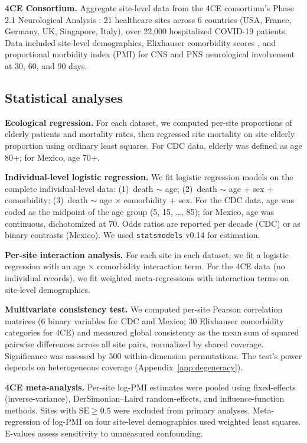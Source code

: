 \documentclass[11pt]{article}
\begin{document}
\textbf{4CE Consortium.}  Aggregate site-level data from the 4CE consortium's
Phase 2.1 Neurological Analysis \cite{four_ce_neuro2021}: 21 healthcare sites
across 6 countries (USA, France, Germany, UK, Singapore, Italy), over 22,000
hospitalized COVID-19 patients.  Data included site-level demographics,
Elixhauser comorbidity scores \cite{elixhauser1998}, and proportional morbidity
index (PMI) for CNS and PNS neurological involvement at 30, 60, and 90 days.

\subsection{Statistical analyses}

\textbf{Ecological regression.}  For each dataset, we computed per-site
proportions of elderly patients and mortality rates, then regressed site
mortality on site elderly proportion using ordinary least squares.  For CDC
data, elderly was defined as age 80+; for Mexico, age 70+.

\textbf{Individual-level logistic regression.}  We fit logistic regression
models on the complete individual-level data: (1)~death $\sim$ age;
(2)~death $\sim$ age + sex + comorbidity; (3)~death $\sim$ age $\times$
comorbidity + sex.  For the CDC data, age was coded as the midpoint of the
age group (5, 15, \ldots, 85); for Mexico, age was continuous, dichotomized
at 70.  Odds ratios are reported per decade (CDC) or as binary contrasts
(Mexico).  We used \texttt{statsmodels} v0.14 for estimation.

\textbf{Per-site interaction analysis.}  For each site in each dataset, we
fit a logistic regression with an age $\times$ comorbidity interaction term.
For the 4CE data (no individual records), we fit weighted meta-regressions
with interaction terms on site-level demographics.

\textbf{Multivariate consistency test.}  We computed per-site Pearson
correlation matrices (6 binary variables for CDC and Mexico; 30 Elixhauser
comorbidity categories for 4CE) and measured global consistency as the mean
sum of squared pairwise differences across all site pairs, normalized by
shared coverage.  Significance was assessed by 500 within-dimension
permutations.  The test's power depends on heterogeneous coverage
(Appendix~\ref{app:degeneracy}).

\textbf{4CE meta-analysis.}  Per-site log-PMI estimates were pooled using
fixed-effects (inverse-variance), DerSimonian--Laird random-effects, and
influence-function methods.  Sites with $\text{SE} \geq 0.5$ were excluded
from primary analyses.  Meta-regression of log-PMI on four site-level
demographics used weighted least squares.  E-values \cite{vanderweele2017}
assess sensitivity to unmeasured confounding.
\end{document}
